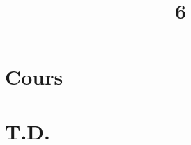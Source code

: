 \documentclass[a4paper]{article}
\title{6}{Séries de fonctions}
\begin{document}
	\part{Cours}
	
	
	\clearpage\null\clearpage
	\renewcommand{\thesection}{}
	\renewcommand{\thesubsection}{}
	\part{T.D.}
\end{document}
